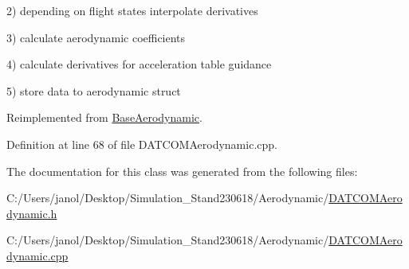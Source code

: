 2) depending on flight states interpolate derivatives

3) calculate aerodynamic coefficients

4) calculate derivatives for acceleration table guidance

5) store data to aerodynamic struct 

Reimplemented from \hyperlink{class_base_aerodynamic_a8a417495c896359b2ee74f5c1c8c08f7}{Base\+Aerodynamic}.



Definition at line 68 of file D\+A\+T\+C\+O\+M\+Aerodynamic.\+cpp.



The documentation for this class was generated from the following files\+:\begin{DoxyCompactItemize}
\item 
C\+:/\+Users/janol/\+Desktop/\+Simulation\+\_\+\+Stand230618/\+Aerodynamic/\hyperlink{_d_a_t_c_o_m_aerodynamic_8h}{D\+A\+T\+C\+O\+M\+Aerodynamic.\+h}\item 
C\+:/\+Users/janol/\+Desktop/\+Simulation\+\_\+\+Stand230618/\+Aerodynamic/\hyperlink{_d_a_t_c_o_m_aerodynamic_8cpp}{D\+A\+T\+C\+O\+M\+Aerodynamic.\+cpp}\end{DoxyCompactItemize}
